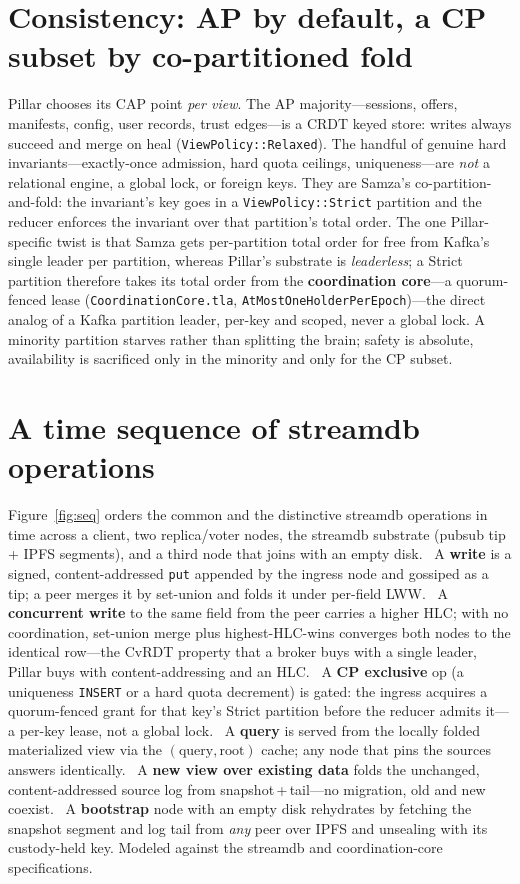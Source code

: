 \documentclass[10pt,twocolumn]{article}
\newcommand{\code}[1]{\texttt{\small #1}}
\begin{document}
\section{Consistency: AP by default, a CP subset by co-partitioned fold}
Pillar chooses its CAP point \emph{per view}. The AP majority---sessions, offers,
manifests, config, user records, trust edges---is a CRDT keyed store: writes always
succeed and merge on heal (\code{ViewPolicy::Relaxed}). The handful of genuine hard
invariants---exactly-once admission, hard quota ceilings, uniqueness---are \emph{not}
a relational engine, a global lock, or foreign keys. They are Samza's
co-partition-and-fold: the invariant's key goes in a \code{ViewPolicy::Strict}
partition and the reducer enforces the invariant over that partition's total order.
The one Pillar-specific twist is that Samza gets per-partition total order for free
from Kafka's single leader per partition, whereas Pillar's substrate is
\emph{leaderless}; a Strict partition therefore takes its total order from the
\textbf{coordination core}---a quorum-fenced lease
(\code{CoordinationCore.tla}, \code{AtMostOneHolderPerEpoch})---the direct analog of a
Kafka partition leader, per-key and scoped, never a global lock. A minority partition
starves rather than splitting the brain; safety is absolute, availability is
sacrificed only in the minority and only for the CP subset.

\section{A time sequence of streamdb operations}
Figure~\ref{fig:seq} orders the common and the distinctive streamdb operations in
time across a client, two replica/voter nodes, the streamdb substrate
(pubsub tip + IPFS segments), and a third node that joins with an empty disk.
~A \textbf{write} is a signed, content-addressed \code{put} appended by the
ingress node and gossiped as a tip; a peer merges it by set-union and folds it under
per-field LWW. ~A \textbf{concurrent write} to the same field from the peer
carries a higher HLC; with no coordination, set-union merge plus highest-HLC-wins
converges both nodes to the identical row---the CvRDT property that a broker buys with
a single leader, Pillar buys with content-addressing and an HLC. ~A
\textbf{CP exclusive} op (a uniqueness \code{INSERT} or a hard quota decrement) is
gated: the ingress acquires a quorum-fenced grant for that key's Strict partition
before the reducer admits it---a per-key lease, not a global lock. ~A
\textbf{query} is served from the locally folded materialized view via the
$(\text{query},\text{root})$ cache; any node that pins the sources answers
identically. ~A \textbf{new view over existing data} folds the unchanged,
content-addressed source log from snapshot\,+\,tail---no migration, old and new
coexist. ~A \textbf{bootstrap} node with an empty disk rehydrates by
fetching the snapshot segment and log tail from \emph{any} peer over IPFS and
unsealing with its custody-held key. Modeled against the streamdb and coordination-core
specifications.
\end{document}

